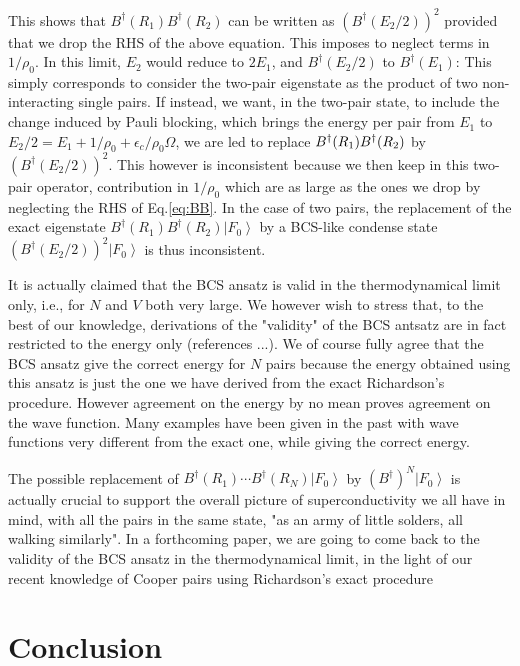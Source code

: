 \documentclass[aps,prb,superscriptaddress,twocolumn]{revtex4}
\begin{document}
This shows that $B^{\dagger}(R_1)B^{\dagger}(R_2)$ can be
written as $\left(B^{\dagger}(E _2/2)\right) ^2$ provided that we
drop the RHS of the above equation. This imposes to neglect terms in $1/\rho_0$. In this limit, $E_2$ would reduce to $2E_1$, and $B^{\dagger}(E _2/2)$ to $%
B^{\dagger}(E _1)$: This simply corresponds to consider the
two-pair eigenstate as the product of two non-interacting single pairs. If
instead, we want, in the two-pair state, to include the
change induced by Pauli blocking, which brings the
energy per pair from $E _1$ to $E _2/2=E
_1+1/\rho_0+\epsilon_c/\rho_0\Omega$, we are led to replace $B^{\dagger}(R_1)B^{%
\dagger}(R_2)$ by $\left(B^{\dagger}(E _2/2)\right) ^2$. This
however is inconsistent because we then keep in this two-pair
operator, contribution in $1/\rho_0$ which are as large as the ones we drop
by neglecting the RHS of Eq.\eqref{eq:BB}. In the case of two pairs, the replacement of
the exact eigenstate $B^{\dagger}(R_1)B^{\dagger}(R_2)\left|F_0\right>  $ by
a BCS-like condense state $\left(B^{\dagger}(E _2/2)\right)
^2\left|F_0\right>  $ is thus inconsistent.

It is actually claimed that the BCS ansatz is valid in the thermodynamical
limit only, i.e., for $N$ and $V$ both very large. We however wish to stress that, to the best of our knowledge,  derivations of the "validity" of the BCS antsatz
are in fact restricted to the energy only (references ...). We of course fully agree that the BCS
ansatz give the correct energy for $N$ pairs because the energy obtained using this ansatz
is just the one we have derived from the exact Richardson's procedure. However
agreement on the energy by no mean proves agreement on the wave function.
Many examples have been given in the past with wave functions very different
from the exact one, while giving the correct energy.

The possible replacement of $B^{\dagger}(R_1)\cdots{}B^{\dagger}(R_N)%
\left|F_0\right>  $ by $\left(B^{\dagger}\right) ^N\left|F_0\right>  $ is
actually crucial to support the overall picture of
superconductivity we all have in mind, with all the pairs in the same state, "as an army of
little solders, all walking similarly". In a forthcoming paper, we are going to come back to the validity of the BCS ansatz in the thermodynamical limit, in the light of our recent knowledge of Cooper pairs using Richardson's exact procedure

\section{Conclusion}
\end{document}
